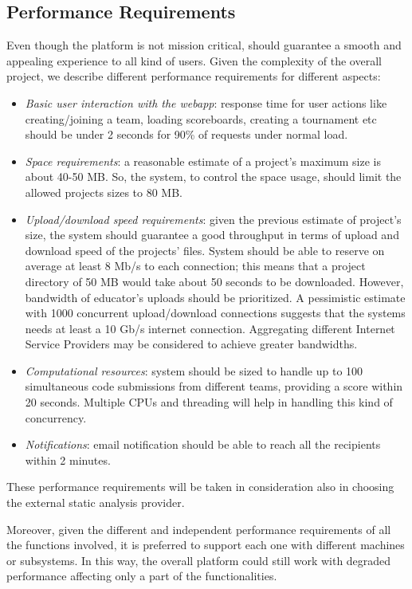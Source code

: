 \subsection{Performance Requirements}
Even though the platform is not mission critical, should guarantee a smooth and appealing experience to all kind of users. Given the complexity of the overall project, we describe different performance requirements for different aspects:
\begin{itemize}
    \item \textit{Basic user interaction with the webapp}: response time for user actions like creating/joining a team, loading scoreboards, creating a tournament etc should be under 2 seconds for 90\% of requests under normal load.
    \item \textit{Space requirements}: a reasonable estimate of a project’s maximum size is about 40-50 MB. So, the system, to control the space usage, should limit the allowed projects sizes to 80 MB.
    \item \textit{Upload/download speed requirements}: given the previous estimate of project’s size, the system should guarantee a good throughput in terms of upload and download speed of the projects’ files. System should be able to reserve on average at least 8 Mb/s to each connection; this means that a project directory of 50 MB would take about 50 seconds to be downloaded. However, bandwidth of educator’s uploads should be prioritized. A pessimistic estimate with 1000 concurrent upload/download connections suggests that the systems needs at least a 10 Gb/s internet connection. Aggregating different Internet Service Providers may be considered to achieve greater bandwidths.
    \item \textit{Computational resources}: system should be sized to handle up to 100 simultaneous code submissions from different teams, providing a score within 20 seconds. Multiple CPUs and threading will help in handling this kind of concurrency.
    \item \textit{Notifications}: email notification should be able to reach all the recipients within 2 minutes.
\end{itemize}
These performance requirements will be taken in consideration also in choosing the external static analysis provider.

Moreover, given the different and independent performance requirements of all the functions involved, it is preferred to support each one with different machines or subsystems. In this way, the overall platform could still work with degraded performance affecting only a part of the functionalities.

